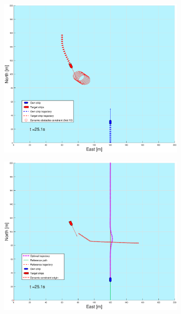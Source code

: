 \begin{figure}[!b]
\begin{subfigure}[b]{0.499\textwidth}
    \end{subfigure}
    \hfill
    \\
    \begin{subfigure}[b]{0.49\textwidth}
        \centering
        \includegraphics[width=\textwidth]{Images/Figures/sving_SO/_Simple_0fig1_time=25}
    \end{subfigure}
    \hfill
    \begin{subfigure}[b]{0.499\textwidth}
        \centering
        \includegraphics[width=\textwidth]{Images/Figures/sving_SO/_Simple_0fig999_time=25}

\end{subfigure}
\end{figure}
